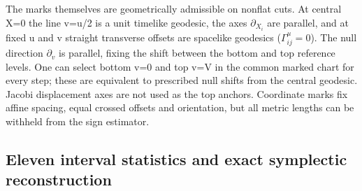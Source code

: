 \documentclass[11pt]{article}
\begin{document}
The marks themselves are geometrically admissible on nonflat cuts. At central X=0 the line v=u/2 is a unit timelike geodesic, the axes \(\partial_{X_i}\) are parallel, and at fixed u and v straight transverse offsets are spacelike geodesics (\(\Gamma^\mu_{ij}=0\)). The null direction \(\partial_v\) is parallel, fixing the shift between the bottom and top reference levels. One can select bottom v=0 and top v=V in the common marked chart for every step; these are equivalent to prescribed null shifts from the central geodesic. Jacobi displacement axes are not used as the top anchors. Coordinate marks fix affine spacing, equal crossed offsets and orientation, but all metric lengths can be withheld from the sign estimator.

\subsection{Eleven interval statistics and exact symplectic reconstruction}\label{eleven-interval-statistics-and-exact-symplectic-reconstruction}
\end{document}

